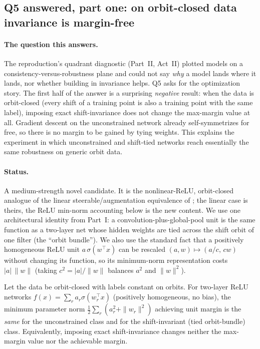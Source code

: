 \subsection{Q5 answered, part one: on orbit-closed data invariance is margin-free}
\label{sub:selfsym}

\paragraph{The question this answers.}
The reproduction's quadrant diagnostic (Part~II, Act~II) plotted models on a
consistency-versus-robustness plane and could not say \emph{why} a model lands where it lands, nor
whether building in invariance helps. Q5 asks for
the optimization story. The first half of the answer is a surprising \emph{negative} result: when the
data is orbit-closed (every shift of a training point is also a training point with the same label),
imposing exact shift-invariance does not change the max-margin value at all. Gradient descent on the
unconstrained network already self-symmetrizes for free, so there is no margin to be gained by tying
weights. This explains the experiment in which unconstrained and shift-tied networks reach essentially
the same robustness on generic orbit data.

\paragraph{Status.}
A medium-strength novel candidate. It is the nonlinear-ReLU, orbit-closed analogue of the linear
steerable/augmentation equivalence of \citet{chenzhu2023}; the linear case is theirs, the ReLU
min-norm accounting below is the new content. We use one architectural identity from Part~I: a
convolution-plus-global-pool unit is the same function as a two-layer net whose hidden weights are
tied across the shift orbit of one filter (the ``orbit bundle''). We also use the standard fact that a
positively homogeneous ReLU unit $a\,\sigma(w^\top x)$ can be rescaled $(a,w)\mapsto(a/c,\,cw)$ without
changing its function, so its minimum-norm representation costs $|a|\,\|w\|$ (taking $c^2 = |a|/\|w\|$
balances $a^2$ and $\|w\|^2$).

\begin{theorem}
\label{thm:selfsym}
Let the data be orbit-closed with labels constant on orbits. For two-layer ReLU networks
$f(x) = \sum_r a_r \sigma(w_r^\top x)$ (positively homogeneous, no bias), the minimum parameter norm
$\tfrac12\sum_r(a_r^2 + \|w_r\|^2)$ achieving unit margin is the \emph{same} for the unconstrained
class and for the shift-invariant (tied orbit-bundle) class. Equivalently, imposing exact
shift-invariance changes neither the max-margin value nor the achievable margin.
\end{theorem}

